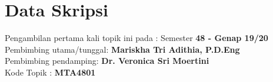 \documentclass[a4paper,twoside]{article}
\begin{document}
\title{\@judultopik}
\author{\nama \textendash \@npm} 

\newcommand{\nama}{Stephen Jordan}
\newcommand{\@npm}{2016730018}
\newcommand{\tanggal}{25/11/2019} %
\newcommand{\@judultopik}{Penerapan Algoritma Anonimisasi Data pada Lingkungan Big Data} %
\newcommand{\kodetopik}{MTA4801}
\newcommand{\jumpemb}{2} %
\newcommand{\pembA}{Mariskha Tri Adithia, P.D.Eng}
\newcommand{\pembB}{Dr. Veronica Sri Moertini}
\newcommand{\semesterPertama}{48 - Genap 19/20} %


\maketitle


\section{Data Skripsi} %
Pengambilan pertama kali topik ini pada : Semester {\bf \semesterPertama} \\
Pembimbing utama/tunggal: {\bf \pembA}\\
Pembimbing pendamping: {\bf \pembB}\\
Kode Topik : {\bf \kodetopik}
\end{document}
